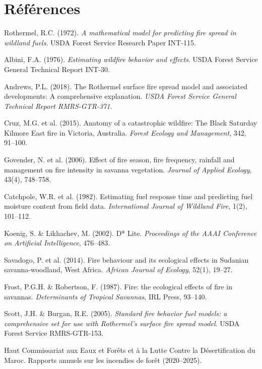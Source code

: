 \section{Références}

\begin{enumerate}[nosep,label={[\arabic*]}]
    \item Rothermel, R.C. (1972). \textit{A mathematical model for predicting fire spread in wildland fuels}. USDA Forest Service Research Paper INT-115.
    \item Albini, F.A. (1976). \textit{Estimating wildfire behavior and effects}. USDA Forest Service General Technical Report INT-30.
    \item Andrews, P.L. (2018). The Rothermel surface fire spread model and associated developments: A comprehensive explanation. \textit{USDA Forest Service General Technical Report RMRS-GTR-371}.
    \item Cruz, M.G. et al. (2015). Anatomy of a catastrophic wildfire: The Black Saturday Kilmore East fire in Victoria, Australia. \textit{Forest Ecology and Management}, 342, 91--100.
    \item Govender, N. et al. (2006). Effect of fire season, fire frequency, rainfall and management on fire intensity in savanna vegetation. \textit{Journal of Applied Ecology}, 43(4), 748--758.
    \item Catchpole, W.R. et al. (1982). Estimating fuel response time and predicting fuel moisture content from field data. \textit{International Journal of Wildland Fire}, 1(2), 101--112.
    \item Koenig, S. \& Likhachev, M. (2002). D* Lite. \textit{Proceedings of the AAAI Conference on Artificial Intelligence}, 476--483.
    \item Savadogo, P. et al. (2014). Fire behaviour and its ecological effects in Sudanian savanna-woodland, West Africa. \textit{African Journal of Ecology}, 52(1), 19--27.
    \item Frost, P.G.H. \& Robertson, F. (1987). Fire: the ecological effects of fire in savannas. \textit{Determinants of Tropical Savannas}, IRL Press, 93--140.
    \item Scott, J.H. \& Burgan, R.E. (2005). \textit{Standard fire behavior fuel models: a comprehensive set for use with Rothermel's surface fire spread model}. USDA Forest Service RMRS-GTR-153.
    \item Haut Commissariat aux Eaux et Forêts et à la Lutte Contre la Désertification du Maroc. Rapports annuels sur les incendies de forêt (2020--2025).
\end{enumerate}

